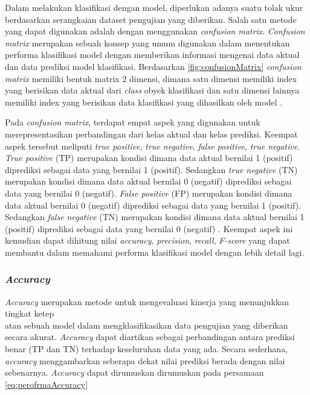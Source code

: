 Dalam melakukan klasifikasi dengan model, diperlukan adanya suatu tolak ukur berdasarkan serangkaian dataset pengujian yang diberikan. Salah satu metode yang dapat digunakan adalah dengan menggunakan \textit{confusion matrix}. \textit{Confusion matrix} merupakan sebuah konsep yang umum digunakan dalam menentukan performa klasifikasi model dengan memberikan informasi mengenai data aktual dan data prediksi model klasifikasi. Berdasarkan \ref{fig:confusionMatrix} \textit{confusion matrix} memiliki bentuk matrix 2 dimensi, dimana satu dimensi memiliki index yang berisikan data aktual dari \textit{class} obyek klasifikasi dan satu dimensi lainnya memiliki index yang berisikan data klasifikasi yang dihasilkan oleh model \parencite{deng2016}. 

Pada \textit{confusion matrix}, terdapat empat aspek yang digunakan untuk merepresentasikan perbandingan dari kelas aktual dan kelas prediksi. Keempat aspek tersebut meliputi \textit{true positive}, \textit{true negative}, \textit{false positive}, \textit{true negative}. \textit{True positive} (TP) merupakan kondisi dimana data aktual bernilai 1 (positif) diprediksi sebagai data yang bernilai 1 (positif). Sedangkan \textit{true negative} (TN) merupakan kondisi dimana data aktual bernilai 0 (negatif) diprediksi sebagai data yang bernilai 0 (negatif). \textit{False positive} (FP) merupakan kondisi dimana data aktual bernilai 0 (negatif) diprediksi sebagai data yang bernilai 1 (positif). Sedangkan \textit{false negative} (TN) merupakan kondisi dimana data aktual bernilai 1 (positif) diprediksi sebagai data yang bernilai 0 (negatif) \parencite{shajihan2020}. Keempat aspek ini kemudian dapat dihitung nilai \textit{accuracy}, \textit{precision}, \textit{recall}, \textit{F-score} yang dapat membantu dalam memahami performa klasifikasi model dengan lebih detail lagi.

\subsubsection{\textit{Accuracy}}
\textit{Accuracy} merupakan metode untuk mengevaluasi kinerja yang menunjukkan tingkat ketep\\atan sebuah model dalam mengklasifikasikan data pengujian yang diberikan secara akurat. \textit{Accuracy} dapat diartikan sebagai perbandingan antara prediksi benar (TP dan TN) terhadap keseluruhan data yang ada. Secara sederhana, \textit{accuracy} menggambarkan seberapa dekat nilai prediksi berada dengan nilai sebenarnya. \textit{Accuracy} dapat dirumuskan dirumuskan pada persamaan \ref{eq:perofrmaAccuracy} \parencite{OvalleMagallanes2020}
   
